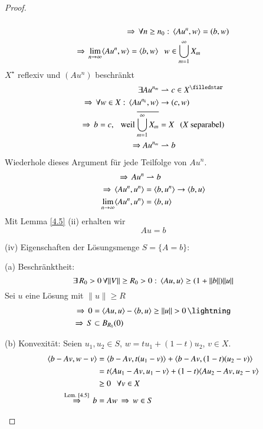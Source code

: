 \begin{proof}
\begin{description}
\[    \]
    \begin{align*}
        \Rightarrow \, \forall n\geq n_0: \, \langle Au^n,w\rangle&=(b,w)\\
        \Rightarrow \, \lim_{n\rightarrow \infty} \langle Au^n,w\rangle=\langle b,w\rangle \hspace{.25cm} w\in \bigcup_{m=1}^\infty X_m
    \end{align*}
    $X^\star$ reflexiv und $(Au^n)$ beschränkt
    \begin{align*}
        \exists Au^{n_m}&\rightharpoonup c \in X^\star\\
        \Ra \, \forall w\in X: \, \lal Au^{n_k},w\ral&\ra (c,w)\\
        \Ra \, b=c, \qq \text{weil } \ol{\bigcup_{m=1}^\infty X_m}&=X \qq (X \text{ separabel})\\
        \Ra Au^{n_m} &\rightharpoonup b
    \end{align*}
    Wiederhole dieses Argument für jede Teilfolge von $Au^n$.
    \begin{align*}
        \Rightarrow \, Au^n&\rightharpoonup b\\
        \Rightarrow \, \langle Au^n,u^n\rangle&=\langle b,u^n\rangle\rightarrow \langle b,u\rangle\\
        \lim_{n\rightarrow \infty} \langle Au^n,u^n\rangle&= \langle b,u\rangle
    \end{align*}
    Mit Lemma \ref{4.5} (ii) erhalten wir
    \[ 
        Au=b
    \]
    \item{(iv)}
    Eigenschaften der Lösungsmenge $S=\{A=b\}$:
    \begin{description}
    \item{(a) Beschränktheit:}
    \[
        \exists \, R_0>0 \, \forall \|V\|\geq R_0>0: \, \langle Au,u\rangle\geq (1+\|b\|)\|u\|
    \]
    Sei $u$ eine Lösung mit $\|u\|\geq R$
    \begin{align*}
        \Ra \, 0&=\lal Au,u\ral -\lal b,u\ral\geq \|u\|>0 \, \lightning\\
        \Ra \, S&\subset B_{R_0}(0)
    \end{align*}
    \item{(b) Konvexität:}
    Seien $u_1,u_2\in S$, $w=tu_1+(1-t)u_2$, $v\in X$.
    \begin{align*}
        \langle b-Av,w-v\rangle &=\langle b-Av,t(u_1-v)\rangle+\langle b-Av,(1-t)(u_2-v)\rangle\\
                 &= t\langle Au_1-Av,u_1-v\rangle+(1-t)\langle Au_2-Av,u_2-v\rangle\\
                 &\geq 0 \hspace{.25cm} \forall v\in X\\
        \overset{\text{Lem. \ref{4.5}}}{\Rightarrow} \, b&=Aw \, \Rightarrow \, w\in S 
    \end{align*}
    \end{description}
    \end{description}
    \[ \]
\end{proof}


